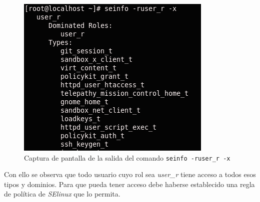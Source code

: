 \documentclass[10pt,a4paper]{article}
\begin{document}
\begin{figure}[h!]
	\centering
	\includegraphics[scale=0.7]{images/parte4_16.png}
	\caption{Captura de pantalla de la salida del comando \texttt{seinfo -ruser\_r -x}}
	\label{fig:parte4_16}
\end{figure}

Con ello se observa que todo usuario cuyo rol sea \textit{user\_r} tiene acceso a todos esos tipos y dominios. Para que pueda tener acceso debe haberse establecido una regla de política de \textit{SElinux} que lo permita.
\end{document}
